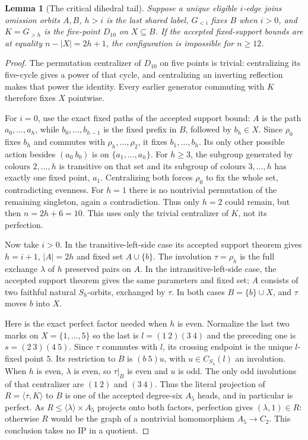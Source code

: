 \documentclass[11pt,a4paper]{article}
\newtheorem{lemma}{Lemma}
\newcommand{\gen}[1]{\langle#1\rangle}
\begin{document}
\begin{lemma}[The critical dihedral tail]\label{critical}
Suppose a unique eligible $i$-edge joins omission orbits $A,B$,
$h>i$ is the last shared label, $G_{<i}$ fixes $B$ when $i>0$,
and $K=G_{>h}$ is the five-point $D_{10}$ on $X\subseteq B$.
If the accepted fixed-support bounds are at equality
$n-|X|=2h+1$, the configuration is impossible for $n\geq12$.
\end{lemma}
\begin{proof}
The permutation centralizer of $D_{10}$ on five points is
trivial: centralizing its five-cycle gives a power of that
cycle, and centralizing an inverting reflection makes that
power the identity. Every earlier generator commuting with
$K$ therefore fixes $X$ pointwise.

For $i=0$, use the exact fixed paths of the accepted support
bound: $A$ is the path $a_0,\ldots,a_h$, while
$b_0,\ldots,b_{h-1}$ is the fixed prefix in $B$, followed by
$b_h\in X$. Since $\rho_0$ fixes $b_h$ and commutes with
$\rho_h,\ldots,\rho_2$, it fixes $b_1,\ldots,b_h$.
Its only other possible action besides $(a_0\ b_0)$ is on
$\{a_1,\ldots,a_h\}$. For $h\geq3$, the subgroup generated
by colours $2,\ldots,h$ is transitive on that set and its
subgroup of colours $3,\ldots,h$ has exactly one fixed point,
$a_1$. Centralizing both forces $\rho_0$ to fix the whole set,
contradicting evenness. For $h=1$ there is no nontrivial
permutation of the remaining singleton, again a contradiction.
Thus only $h=2$ could remain, but then $n=2h+6=10$.
This uses only the trivial centralizer of $K$, not its perfection.

Now take $i>0$. In the transitive-left-side case its accepted
support theorem gives $h=i+1$, $|A|=2h$ and fixed set
$A\cup\{b\}$. The involution $\tau=\rho_h$ is the full
exchange $\lambda$ of $h$ preserved pairs on $A$.
In the intransitive-left-side case, the accepted support
theorem gives the same parameters and fixed set; $A$ consists
of two faithful natural $S_h$-orbits, exchanged by $\tau$.
In both cases $B=\{b\}\cup X$, and $\tau$ moves $b$ into $X$.

Here is the exact perfect factor needed when $h$ is even.
Normalize the last two marks on $X=\{1,\ldots,5\}$ so the
last is $l=(1\ 2)(3\ 4)$ and the preceding one is
$s=(2\ 3)(4\ 5)$. Since $\tau$ commutes with $l$, its
crossing endpoint is the unique $l$-fixed point $5$.
Its restriction to $B$ is $(b\ 5)u$, with
$u\in C_{S_4}(l)$ an involution. When $h$ is even,
$\lambda$ is even, so $\tau|_B$ is even and $u$ is odd.
The only odd involutions of that centralizer are $(1\ 2)$
and $(3\ 4)$. Thus the literal projection of
$R=\gen{\tau,K}$ to $B$ is one of the accepted degree-six
$A_5$ heads, and in particular is perfect. As
$R\leq\gen\lambda\times A_5$ projects onto both factors,
perfection gives $(\lambda,1)\in R$: otherwise $R$ would
be the graph of a nontrivial homomorphism $A_5\to C_2$.
This conclusion takes no IP in a quotient.


\end{proof}
\end{document}
